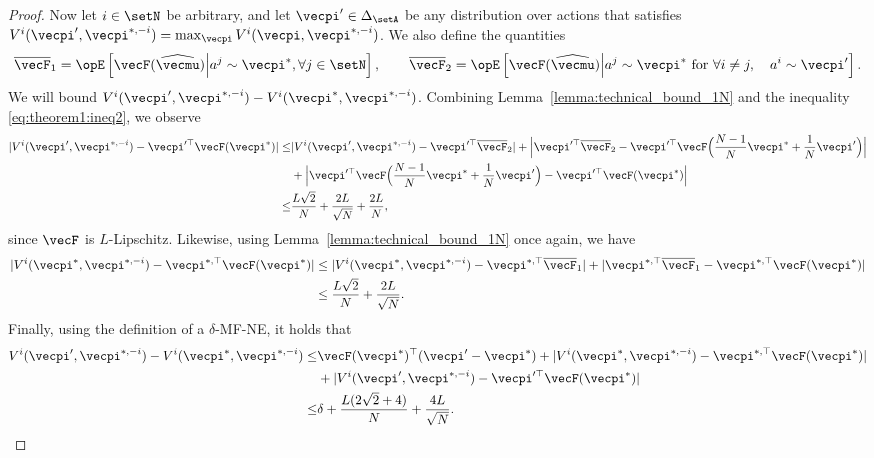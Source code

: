\begin{proof}
Now let $i\in \setN$ be arbitrary, and let $\vecpi' \in \Delta_\setA$ be any distribution over actions that satisfies $V^i(\vecpi', \vecpi^{*, -i}) = \max_{\vecpi} V^i(\vecpi, \vecpi^{*, -i})$.
We also define the quantities
\begin{align*}
    \overline{\vecF}_1 = \Exop\left[\vecF(\widehat{\vecmu}) \middle| a^j \sim \vecpi^*, \forall j\in\setN \right], \qquad
    \overline{\vecF}_2 = \Exop\left[\vecF(\widehat{\vecmu}) \middle| a^j \sim \vecpi^* \text{ for } \forall i \neq j, \quad a^i \sim \vecpi' \right].
\end{align*}
We will bound $V^i(\vecpi', \vecpi^{*, -i}) - V^i(\vecpi^*, \vecpi^{*, -i})$.
Combining Lemma~\ref{lemma:technical_bound_1N} and the inequality \eqref{eq:theorem1:ineq2}, we observe
\begin{align*}
    |V^i(\vecpi', \vecpi^{*, -i}) - \vecpi'^\top\vecF(\vecpi^*)| \leq & |V^i(\vecpi', \vecpi^{*, -i}) -  \vecpi'^\top \overline{\vecF}_2 |
    + \Big|\vecpi'^\top \overline{\vecF}_2 - \vecpi'^\top\vecF\Big(\frac{N-1}{N}\vecpi^* + \frac{1}{N} \vecpi'\Big)\Big| \\
    &+ \Big|\vecpi'^\top\vecF\Big(\frac{N-1}{N}\vecpi^* + \frac{1}{N} \vecpi'\Big) - \vecpi'^\top\vecF(\vecpi^*)\Big| \\
    \leq & \frac{L\sqrt{2}}{N} + \frac{2L}{\sqrt{N}} + \frac{2L}{N},
\end{align*}
since $\vecF$ is $L$-Lipschitz.
Likewise, using Lemma~\ref{lemma:technical_bound_1N} once again, we have
\begin{align*}
    |V^i(\vecpi^*, \vecpi^{*, -i}) - \vecpi^{*,\top}\vecF(\vecpi^*)| &\leq |V^i(\vecpi^*, \vecpi^{*, -i}) - \vecpi^{*,\top}\overline{\vecF}_1| + |\vecpi^{*,\top} \overline{\vecF}_1 - \vecpi^{*,\top}\vecF(\vecpi^*)|  \\
    &\leq \frac{L\sqrt{2}}{N} + \frac{2L}{\sqrt{N}}.
\end{align*}
Finally, using the definition of a $\delta$-MF-NE, it holds that
\begin{align*}
V^i(\vecpi', \vecpi^{*, -i}) - V^i(\vecpi^*, \vecpi^{*, -i}) \leq &\vecF(\vecpi^*)^\top (\vecpi' - \vecpi^*) +|V^i(\vecpi^*, \vecpi^{*, -i}) -  \vecpi^{*,\top}\vecF(\vecpi^*)| \\
    & + |V^i(\vecpi', \vecpi^{*, -i}) - \vecpi'^\top\vecF(\vecpi^*)| \\
\leq &\delta + \frac{L(2\sqrt{2} + 4)}{N} + \frac{4L}{\sqrt{N}}.
\end{align*}
\end{proof}

